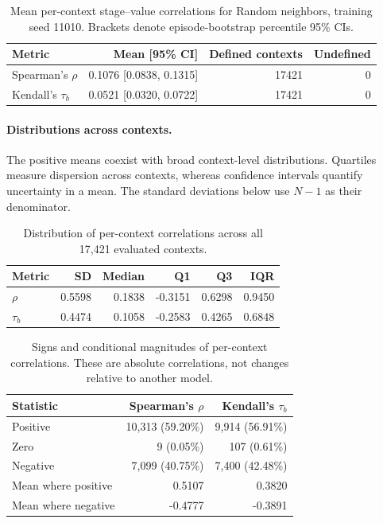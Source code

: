 \begin{table}[!htbp]
\centering
\small
\caption{Mean per-context stage--value correlations for Random neighbors, training seed 11010. Brackets denote episode-bootstrap percentile 95\% CIs.}
\label{tab:random11010_metrics}
\begin{tabular}{lrrr}
\toprule
Metric & Mean [95\% CI] & Defined contexts & Undefined \\
\midrule
Spearman's $\rho$ & 0.1076 [0.0838, 0.1315] & 17421 & 0 \\
Kendall's $\tau_b$ & 0.0521 [0.0320, 0.0722] & 17421 & 0 \\
\bottomrule
\end{tabular}
\end{table}

\paragraph{Distributions across contexts.}
The positive means coexist with broad context-level distributions. Quartiles measure dispersion across contexts, whereas confidence intervals quantify uncertainty in a mean. The standard deviations below use $N-1$ as their denominator.

\begin{table}[!htbp]
\centering
\small
\caption{Distribution of per-context correlations across all 17,421 evaluated contexts.}
\label{tab:random11010_distribution}
\begin{tabular}{lrrrrr}
\toprule
Metric & SD & Median & Q1 & Q3 & IQR \\
\midrule
$\rho$ & 0.5598 & 0.1838 & -0.3151 & 0.6298 & 0.9450 \\
$\tau_b$ & 0.4474 & 0.1058 & -0.2583 & 0.4265 & 0.6848 \\
\bottomrule
\end{tabular}
\end{table}

\begin{table}[!htbp]
\centering
\small
\caption{Signs and conditional magnitudes of per-context correlations. These are absolute correlations, not changes relative to another model.}
\label{tab:random11010_direction}
\begin{tabular}{lrr}
\toprule
Statistic & Spearman's $\rho$ & Kendall's $\tau_b$ \\
\midrule
Positive & 10,313 (59.20\%) & 9,914 (56.91\%) \\
Zero & 9 (0.05\%) & 107 (0.61\%) \\
Negative & 7,099 (40.75\%) & 7,400 (42.48\%) \\
Mean where positive & 0.5107 & 0.3820 \\
Mean where negative & -0.4777 & -0.3891 \\
\bottomrule
\end{tabular}
\end{table}

